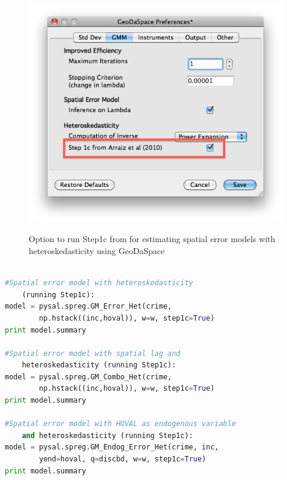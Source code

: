 \documentclass{article}
\begin{document}
\begin{figure}[htb]
\caption{Option to run Step1c from \citet{Arraiz10} for estimating spatial error models with heteroskedasticity using GeoDaSpace}
\label{f:GS_pref_step1c}
\begin{center}
\includegraphics[width=0.7\linewidth]{GS_pref_step1c.png}\\
\end{center}
\end{figure}

\begin{code}
\begin{lstlisting}[label=lt:het_endog_stata,caption=Using PySAL to match the results of spatial error models with heteroskedasticity and endogenous variables or spatial lag from Stata,language=Python]

#Spatial error model with heteroskedasticity
    (running Step1c):
model = pysal.spreg.GM_Error_Het(crime,
        np.hstack((inc,hoval)), w=w, step1c=True)
print model.summary

#Spatial error model with spatial lag and
    heteroskedasticity (running Step1c):
model = pysal.spreg.GM_Combo_Het(crime,
        np.hstack((inc,hoval)), w=w, step1c=True)
print model.summary

#Spatial error model with HOVAL as endogenous variable
    and heteroskedasticity (running Step1c):
model = pysal.spreg.GM_Endog_Error_Het(crime, inc,
        yend=hoval, q=discbd, w=w, step1c=True)
print model.summary

\end{lstlisting}
\end{code}


\newpage


\end{document}
